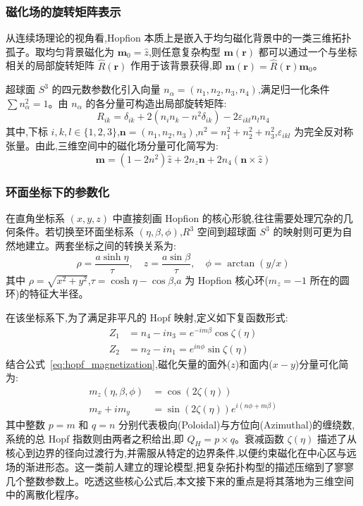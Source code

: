 \documentclass{article}
\begin{document}
\subsubsection*{磁化场的旋转矩阵表示}
从连续场理论的视角看,Hopfion 本质上是嵌入于均匀磁化背景中的一类三维拓扑孤子。取均匀背景磁化为 $\mathbf{m}_0 = \hat{z}$,则任意复杂构型 $\mathbf{m}(\mathbf{r})$ 都可以通过一个与坐标相关的局部旋转矩阵 $\hat{R}(\mathbf{r})$ 作用于该背景获得,即 $\mathbf{m}(\mathbf{r}) = \hat{R}(\mathbf{r}) \mathbf{m}_0$。

超球面 $S^3$ 的四元数参数化引入向量 $n_\alpha = (n_1, n_2, n_3, n_4)$,满足归一化条件 $\sum n_\alpha^2 = 1$。由 $n_\alpha$ 的各分量可构造出局部旋转矩阵:
\begin{equation}
    R_{ik} = \delta_{ik} + 2(n_i n_k - n^2 \delta_{ik}) - 2\varepsilon_{ikl} n_l n_4
\end{equation}
其中,下标 $i, k, l \in \{1,2,3\}$,$\mathbf{n} = (n_1, n_2, n_3)$,$n^2 = n_1^2 + n_2^2 + n_3^2$,$\varepsilon_{ikl}$ 为完全反对称张量。由此,三维空间中的磁化场分量可化简写为:
\begin{equation}
    \mathbf{m} = (1 - 2n^2)\hat{z} + 2n_z \mathbf{n} + 2n_4(\mathbf{n} \times \hat{z})
    \label{eq:hopf_magnetization}
\end{equation}

\subsubsection*{环面坐标下的参数化}
在直角坐标系 $(x,y,z)$ 中直接刻画 Hopfion 的核心形貌,往往需要处理冗杂的几何条件。若切换至环面坐标系 $(\eta, \beta, \phi)$,$R^3$ 空间到超球面 $S^3$ 的映射则可更为自然地建立。两套坐标之间的转换关系为:
\begin{equation}
    \rho = \frac{a \sinh \eta}{\tau}, \quad z = \frac{a \sin \beta}{\tau}, \quad \phi = \arctan(y/x)
\end{equation}
其中 $\rho = \sqrt{x^2+y^2}$,$\tau = \cosh \eta - \cos \beta$,$a$ 为 Hopfion 核心环($m_z=-1$ 所在的圆环)的特征大半径。

在该坐标系下,为了满足非平凡的 Hopf 映射,定义如下复函数形式:
\begin{align}
    Z_1 &= n_4 - i n_3 = e^{-im\beta} \cos \zeta(\eta) \\
    Z_2 &= n_2 - i n_1 = e^{in\phi} \sin \zeta(\eta)
\end{align}
结合公式~\eqref{eq:hopf_magnetization},磁化矢量的面外($z$)和面内($x-y$)分量可化简为:
\begin{align}
    m_z(\eta, \beta, \phi) &= \cos(2\zeta(\eta)) \\
    m_x + i m_y &= \sin(2\zeta(\eta)) e^{i(n\phi + m\beta)}
\end{align}
其中整数 $p=m$ 和 $q=n$ 分别代表极向(Poloidal)与方位向(Azimuthal)的缠绕数,系统的总 Hopf 指数则由两者之积给出,即 $Q_H = p \times q$。衰减函数 $\zeta(\eta)$ 描述了从核心到边界的径向过渡行为,并需服从特定的边界条件,以便约束磁化在中心区与远场的渐进形态。这一类前人建立的理论模型,把复杂拓扑构型的描述压缩到了寥寥几个整数参数上。吃透这些核心公式后,本文接下来的重点是将其落地为三维空间中的离散化程序。
\end{document}

